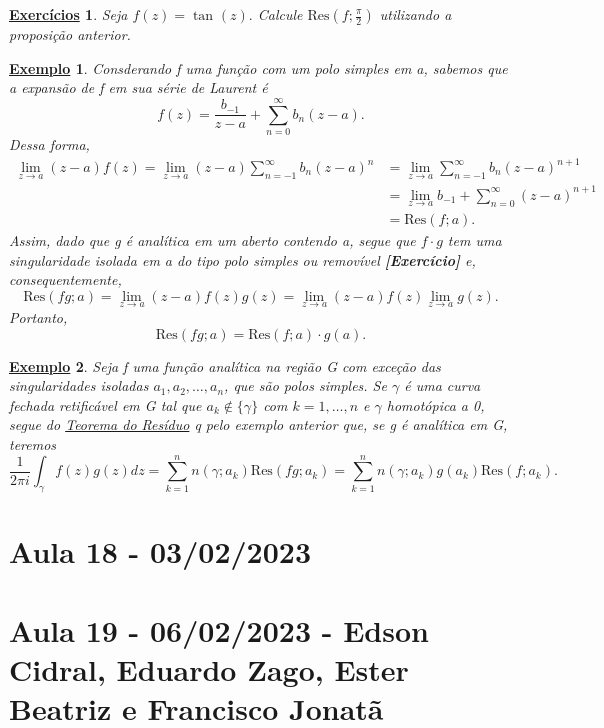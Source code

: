 \documentclass{article}
\newtheorem{example}{\underline{Exemplo}}[section]
\newtheorem*{exer*}{\underline{Exerc\'icios}}
\begin{document}
 \begin{exer*}
   Seja \(f(z) = \tan^{}{(z)}.\) Calcule \(\mathrm{Res}(f; \frac{\pi }{2})\) utilizando a proposição anterior.
 \end{exer*}
 \begin{example}
  Consderando f uma função com um polo simples em a, sabemos que a expansão de f em sua série de Laurent é 
  \[
    f(z) = \frac{b_{-1}}{z-a} + \sum\limits_{n=0}^{\infty}b_{n}(z-a).
  \]
  Dessa forma,
 \begin{align*}
   \lim_{z\to a}(z-a)f(z) = \lim_{z\to a}(z-a)\sum\limits_{n=-1}^{\infty}b_{n}(z-a)^{n} &= \lim_{z\to a}\sum\limits_{n=-1}^{\infty}b_{n}(z-a)^{n+1}\\
                                                                                        &= \lim_{z\to a}b_{-1} + \sum\limits_{n=0}^{\infty}(z-a)^{n+1}\\
                                                                                        &= \mathrm{Res}(f; a).
 \end{align*}
  Assim, dado que g é analítica em um aberto contendo a, segue que \(f \cdot g\) tem uma singularidade isolada em a do tipo polo simples
ou removível \textbf{[Exercício]} e, consequentemente, 
  \[
    \mathrm{Res}(fg; a) = \lim_{z\to a}(z-a)f(z)g(z) = \lim_{z\to a}(z-a)f(z)\lim_{z\to a}g(z).
  \]
  Portanto, 
  \[
    \mathrm{Res}(fg; a) = \mathrm{Res}(f; a)\cdot g(a).
  \]
 \end{example}
 \begin{example}
   Seja f uma função analítica na região G com exceção das singularidades isoladas \(a_{1}, a_{2}, \dotsc , a_{n}\), que são polos simples.
Se \(\gamma \) é uma curva fechada retificável em G tal que \(a_{k}\not\in \{\gamma \}\) com \(k=1,\dotsc ,n \) e \(\gamma \) homotópica a 0,
segue do \hyperlink{residue}{Teorema do Resíduo} q pelo exemplo anterior que, se g é analítica em G, teremos 
  \[
    \frac{1}{2\pi i}\int_{\gamma }^{}f(z)g(z)dz = \sum\limits_{k=1}^{n}n(\gamma ; a_{k})\mathrm{Res}(fg; a_{k}) = \sum\limits_{k=1}^{n}n(\gamma ; a_{k})g(a_{k})\mathrm{Res}(f; a_{k}).
  \]
 \end{example}
  \newpage

  \section{Aula 18 - 03/02/2023}
  \newpage

  \section{Aula 19 - 06/02/2023 - Edson Cidral, Eduardo Zago, Ester Beatriz e Francisco Jonatã}
\end{document}
